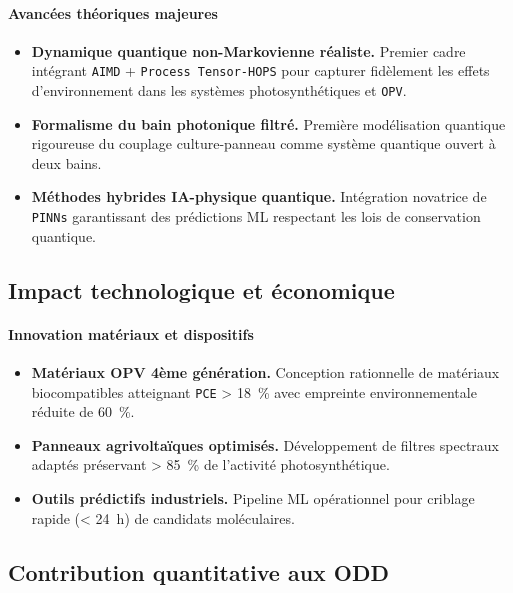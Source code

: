 \documentclass[12pt, a4paper]{article}
\begin{document}
\paragraph{Avancées théoriques majeures}
\begin{itemize}
    \item \textbf{Dynamique quantique non-Markovienne réaliste.} Premier cadre intégrant \texttt{AIMD} + \texttt{Process Tensor-HOPS} pour capturer fidèlement les effets d'environnement dans les systèmes photosynthétiques et \texttt{OPV}.
    
    \item \textbf{Formalisme du bain photonique filtré.} Première modélisation quantique rigoureuse du couplage culture-panneau comme système quantique ouvert à deux bains.
    
    \item \textbf{Méthodes hybrides IA-physique quantique.} Intégration novatrice de \texttt{PINNs} garantissant des prédictions ML respectant les lois de conservation quantique.
\end{itemize}

\subsection{Impact technologique et économique}

\paragraph{Innovation matériaux et dispositifs}
\begin{itemize}
    \item \textbf{Matériaux OPV 4ème génération.} Conception rationnelle de matériaux biocompatibles atteignant \texttt{PCE} > \SI{18}{\percent} avec empreinte environnementale réduite de \SI{60}{\percent}.
    
    \item \textbf{Panneaux agrivoltaïques optimisés.} Développement de filtres spectraux adaptés préservant > \SI{85}{\percent} de l'activité photosynthétique.
    
    \item \textbf{Outils prédictifs industriels.} Pipeline ML opérationnel pour criblage rapide (< \SI{24}{\hour}) de candidats moléculaires.
\end{itemize}

\subsection{Contribution quantitative aux ODD}
\end{document}
